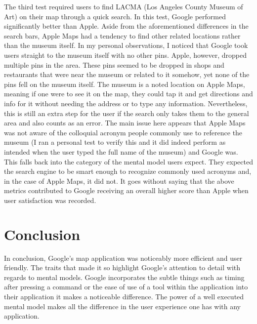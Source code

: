 \documentclass[12pt, oneside]{article}
\begin{document}
The third test required users to find LACMA (Los Angeles County Museum of Art) on their map through a quick search. In this test, Google performed significantly better than Apple. Aside from the aforementioned differences in the search bars, Apple Maps had a tendency to find other related locations rather than the museum itself. In my personal observations, I noticed that Google took users straight to the museum itself with no other pins. Apple, however, dropped multiple pins in the area. These pins seemed to be dropped in shops and restaurants that were near the museum or related to it somehow, yet none of the pins fell on the museum itself. The museum is a noted location on Apple Maps, meaning if one were to see it on the map, they could tap it and get directions and info for it without needing the address or to type any information. Nevertheless, this is still an extra step for the user if the search only takes them to the general area and also counts as an error. The main issue here appears that Apple Maps was not aware of the colloquial acronym people commonly use to reference the museum (I ran a personal test to verify this and it did indeed perform as intended when the user typed the full name of the museum) and Google was. This falls back into the category of the mental model users expect. They expected the search engine to be smart enough to recognize commonly used acronyms and, in the case of Apple Maps, it did not. It goes without saying that the above metrics contributed to Google receiving an overall higher score than Apple when user satisfaction was recorded. 

\section{Conclusion}
In conclusion, Google's map application was noticeably more efficient and user friendly. The traits that made it so highlight Google's attention to detail with regards to mental models. Google incorporates the subtle things such as timing after pressing a command or the ease of use of a tool within the application into their application it makes a noticeable difference. The power of a well executed mental model makes all the difference in the user experience one has with any application.
\end{document}
